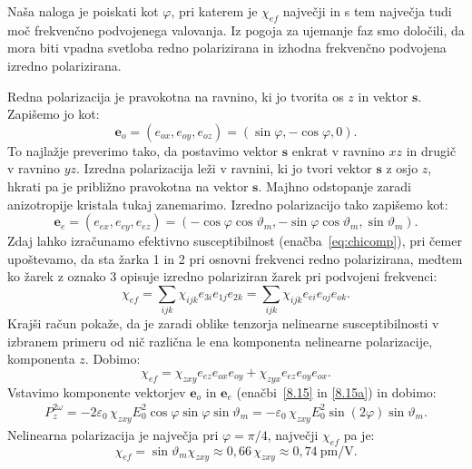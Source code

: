 Naša naloga je poiskati kot $\varphi$, pri katerem je 
$\chi_{ef}$ največji in s tem največja tudi moč frekvenčno podvojenega valovanja.
Iz pogoja za ujemanje faz smo določili, da mora biti vpadna svetloba redno polarizirana in 
izhodna frekvenčno podvojena izredno polarizirana. 

Redna polarizacija je pravokotna na 
ravnino, ki jo tvorita os $z$ in vektor $\mathbf{s}$. Zapišemo jo kot:
\begin{equation}
\mathbf{e}_o=(e_{ox}, e_{oy}, e_{oz}) = (\sin\varphi,-\cos\varphi,0).
\label{8.15}
\end{equation}
To najlažje preverimo tako, da postavimo vektor $\mathbf{s}$ enkrat v ravnino $xz$ in
drugič v ravnino $yz$. Izredna polarizacija leži v ravnini, ki jo tvori 
vektor $\mathbf{s}$ z osjo $z$, hkrati pa je približno pravokotna na vektor $\mathbf{s}$. 
Majhno odstopanje zaradi anizotropije kristala tukaj zanemarimo. Izredno polarizacijo 
tako zapišemo kot: 
\begin{equation}
\mathbf{e}_e=(e_{ex}, e_{ey}, e_{ez}) 
=(-\cos \varphi \cos \vartheta_m,-\sin \varphi \cos \vartheta_m ,\sin \vartheta_m).
\label{8.15a}
\end{equation}
Zdaj lahko izračunamo efektivno susceptibilnost (enačba~\ref{eq:chicomp}), 
pri čemer upoštevamo, da sta žarka 1 in 2 pri osnovni frekvenci redno polarizirana, medtem ko
žarek z oznako 3 opisuje izredno polariziran žarek pri podvojeni frekvenci:
\begin{equation}
\chi_{ef} = \sum_{ijk} \chi_{ijk} e_{3i} e_{1j} e_{2k} = \sum_{ijk} \chi_{ijk} e_{ei} e_{oj} e_{ok}.
\end{equation}
Krajši račun pokaže, da je zaradi oblike tenzorja nelinearne susceptibilnosti v izbranem 
primeru od nič različna le ena komponenta nelinearne polarizacije, komponenta $z$. Dobimo:
\begin{equation}
\chi_{ef} = \chi_{zxy} e_{ez} e_{ox} e_{oy} + \chi_{zyx} e_{ez} e_{oy} e_{ox}.
\end{equation}
Vstavimo komponente vektorjev $\mathbf{e}_o$ in $\mathbf{e}_e$ (enačbi~\ref{8.15} in \ref{8.15a}) in dobimo:
\begin{align}
P_{z}^{2\omega}=- 2\varepsilon_0\, \chi_{zxy}E_{0}^2\cos\varphi\sin\varphi
\sin\vartheta_m = - \varepsilon_0\, \chi_{zxy}E_{0}^2\sin(2\varphi) \sin\vartheta_m.
\label{8.151}
\end{align}
Nelinearna polarizacija je največja pri $\varphi=\pi/4$, največji $\chi_{ef}$  pa je:
\begin{equation}
\chi_{ef}= 
\sin\vartheta_m \chi_{zxy} \approx 0,66\, \chi_{zxy} \approx 
0,74~\si{\pico\metre/\volt}.
\label{8.16}
\end{equation}

